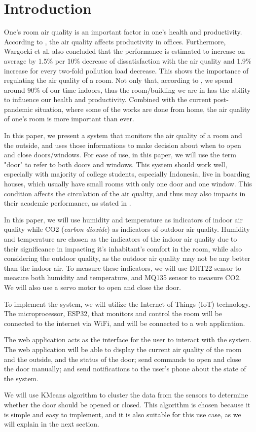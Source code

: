 \section{Introduction}
One's room air quality is an important factor in one's health and productivity.
According to \cite{productivity_air_quality_wargocki_2000}, the air quality affects productivity in offices. Furthermore, Wargocki et al. also concluded that the performance is estimated to increase on average by 1.5\% per 10\% decrease of dissatisfaction with the air quality and 1.9\% increase for every two-fold pollution load decrease. This shows the importance of regulating the air quality of a room.
Not only that, according to \cite{indoor_air_quality_stafford_2015}, we spend around 90\% of our time indoors, thus the room/building we are in has the ability to influence our health and productivity.
Combined with the current post-pandemic situation, where some of the works are done from home, the air quality of one's room is more important than ever.

In this paper, we present a system that monitors the air quality of a room and the outside, and uses those informations to make decision about when to open and close doors/windows.
For ease of use, in this paper, we will use the term "door" to refer to both doors and windows.
This system should work well, especially with majority of college students, especially Indonesia, live in boarding houses, which usually have small rooms with only one door and one window. This condition affects the circulation of the air quality, and thus may also impacts in their academic performance, as stated in \cite{indoor_air_quality_stafford_2015}.

In this paper, we will use humidity and temperature as indicators of indoor air quality while CO2 (\textit{carbon dioxide}) as indicators of outdoor air quality.
Humidity and temperature are chosen as the indicators of the indoor air quality due to their significance in impacting it's inhabitant's comfort in the room, while also considering the outdoor quality, as the outdoor air quality may not be any better than the indoor air.
To measure these indicators, we will use DHT22 sensor to measure both humidity and temperature, and MQ135 sensor to measure CO2. We will also use a servo motor to open and close the door.

To implement the system, we will utilize the Internet of Things (IoT) technology.
The microprocessor, ESP32, that monitors and control the room will be connected to the internet via WiFi, and will be connected to a web application.

The web application acts as the interface for the user to interact with the system.
The web application will be able to display the current air quality of the room and the outside, and the status of the door; send commands to open and close the door manually; and send notifications to the user's phone about the state of the system.

We will use KMeans algorithm to cluster the data from the sensors to determine whether the door should be opened or closed. This algorithm is chosen because it is simple and easy to implement, and it is also suitable for this use case, as we will explain in the next section.
